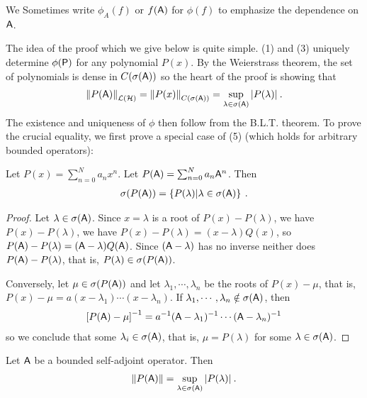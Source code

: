 We Sometimes write  $\phi_A(f)$ or $f(\mathsf{A})$ for $\phi(f)$ to emphasize the dependence on $\mathsf{A}$.

The idea of the proof which we give below is quite simple. (1) and (3) uniquely determine $\phi(\mathsf{P})$ for any polynomial $P(x)$. By the Weierstrass theorem, the set of polynomials is dense in $C(\sigma( \mathsf{A}))$ so the heart of the proof is showing that
\begin{align}
    \left \Vert P(\mathsf{A}) \right \Vert_{\mathcal{L}(\mathcal{H})} = \left \Vert P(x) \right \Vert_{C(\sigma(\mathsf{A})) } = \sup_{\lambda \in \sigma(\mathsf{A})} |P(\lambda)| \:.
\end{align}
The existence and uniqueness of $\phi$ then follow from the B.L.T. theorem.
To prove the crucial equality, we first prove a special case of (5) (which holds for arbitrary bounded operators):

\begin{lemma}
    Let $P(x) = \sum_{n=0}^N a_n x^n$. Let $P(\mathsf{A}) = \sum_{n=0}^N a_n \mathsf{A}^n$. Then \begin{align}
        \sigma(P(\mathsf{A})) = \left \lbrace P(\lambda) | \lambda \in \sigma(\mathsf{A}) \right \rbrace \:.
    \end{align}
\end{lemma}

\begin{proof}
    Let $\lambda \in \sigma(\mathsf{A})$. Since $x = \lambda$ is a root of $P(x) - P(\lambda)$, we have $P(x) - P(\lambda)$, we have $P(x)- P(\lambda) = (x-\lambda) Q(x)$, so $P(\mathsf{A}) - P(\lambda) = (\mathsf{A} - \lambda) Q(\mathsf{A})$.
    Since $(\mathsf{A} - \lambda)$ has no inverse neither does $P(\mathsf{A}) - P(\lambda)$, that is, $P(\lambda) \in \sigma(P(\mathsf{A}))$.

    Conversely, let $\mu \in \sigma(P(\mathsf{A}))$ and let $\lambda_1, \cdots, \lambda_n$ be the roots of $P(x)- \mu$, that is, $P(x) - \mu = a (x-\lambda_1) \cdots (x- \lambda_n)$. If $\lambda_1, \cdots, \lambda_n \notin \sigma(\mathsf{A})$, then \begin{align}
        \left[ P(\mathsf{A}) - \mu \right]^{-1} = a^{-1} (\mathsf{A} - \lambda_1)^{-1} \cdots (\mathsf{A} - \lambda_n)^{-1}
    \end{align}
    so we conclude that some $\lambda_i \in \sigma(\mathsf{A})$, that is, $\mu = P(\lambda)$ for some $\lambda \in \sigma(\mathsf{A})$.
\end{proof}

\begin{lemma}
    Let $\mathsf{A}$ be a bounded self-adjoint operator. Then
    \begin{align}
        \left \Vert P(\mathsf{A}) \right \Vert = \sup_{\lambda \in \sigma (\mathsf{A})} |P(\lambda)| \:.
    \end{align}
\end{lemma}

